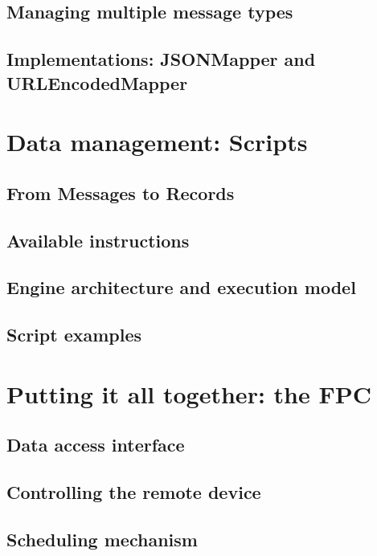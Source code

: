 \subsection{Managing multiple message types}

\subsection{Implementations: JSONMapper and URLEncodedMapper}


\section{Data management: Scripts}
\label{sec:components.script}

\subsection{From Messages to Records}

\subsection{Available instructions}

\subsection{Engine architecture and execution model}

\subsection{Script examples}


\section{Putting it all together: the FPC}

\subsection{Data access interface}

\subsection{Controlling the remote device}

\subsection{Scheduling mechanism}


